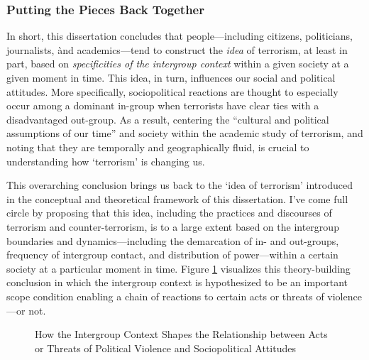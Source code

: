 \newpage

\subsubsection{Putting the Pieces Back Together}
In short, this dissertation concludes that people---including citizens, politicians, journalists, ànd academics---tend to construct the \textit{idea} of terrorism, at least in part, based on \textit{specificities of the intergroup context} within a given society at a given moment in time. This idea, in turn, influences our social and political attitudes. More specifically, sociopolitical reactions are thought to especially occur among a dominant in-group when terrorists have clear ties with a disadvantaged out-group. As a result, centering the ``cultural and political assumptions of our time'' and society within the academic study of terrorism, and noting that they are temporally and geographically fluid, is crucial to understanding how ‘terrorism’ is changing us. 

This overarching conclusion brings us back to the `idea of terrorism' introduced in the conceptual and theoretical framework of this dissertation. I've come full circle by proposing that this idea, including the practices and discourses of terrorism and counter-terrorism, is to a large extent based on the intergroup boundaries and dynamics---including the demarcation of in- and out-groups, frequency of intergroup contact, and distribution of power---within a certain society at a particular moment in time. Figure \ref{fig:conclusion} visualizes this theory-building conclusion in which the intergroup context is hypothesized to be an important scope condition enabling a chain of reactions to certain acts or threats of violence---or not.


\vspace{3mm}
\begin{figure}[H]
\caption{How the Intergroup Context Shapes the Relationship between Acts or Threats of Political Violence and Sociopolitical Attitudes}
\label{fig:conclusion}    
\end{figure}



